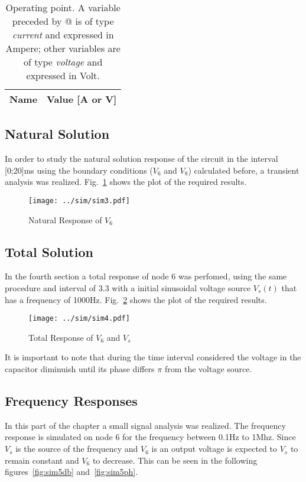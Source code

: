 \begin{table}[H]
  \centering
  \begin{tabular}{|l|r|}
    \hline    
    {\bf Name} & {\bf Value [A or V]} \\ \hline
    
  \end{tabular}
  \caption{Operating point. A variable preceded by @ is of type {\em current}
    and expressed in Ampere; other variables are of type {\it voltage} and expressed in
    Volt.}
  \label{tab:op2}
\end{table}

\subsection{Natural Solution}
In order to study the natural solution response of the circuit in the interval [0;20]ms using the boundary conditions ($V_{6}$ and $V_{8}$) calculated before, a transient analysis was realized. 
Fig.~\ref{fig:sim3} shows the plot of the required results.

\begin{figure}[H] \centering
\texttt{[image: ../sim/sim3.pdf]}
\caption{Natural Response of $V_{6}$} 
\label{fig:sim3}
\end{figure}

\subsection{Total Solution}

In the fourth section a total response of node 6 was perfomed, using the same procedure and interval of 3.3 with a initial sinusoidal voltage source $V_{s}(t)$ that has a frequency of 1000Hz. 
Fig.~\ref{fig:sim4} shows the plot of the required results.

\begin{figure}[H] \centering
\texttt{[image: ../sim/sim4.pdf]}
\caption{Total Response of $V_{6}$ and $V_{s}$}
\label{fig:sim4}
\end{figure}
It is important to note that during the time interval considered the voltage in the capacitor diminuish until its phase differs $\pi$ from the voltage source.

\subsection{Frequency Responses}

In this part of the chapter a small signal analysis was realized. The frequency response is simulated on node 6 for the frequency between 0.1Hz to 1Mhz. 
Since $V_{s}$ is the source of the frequency and $V_{6}$ is an output voltage is expected to $V_{s}$ to remain constant and $V_{6}$ to decrease. This can be seen in the following figures~\ref{fig:sim5db} and~\ref{fig:sim5ph}.

